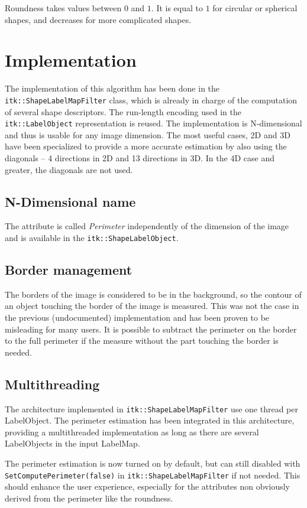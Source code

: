 \documentclass{InsightArticle}
\begin{document}
Roundness takes values between $0$ and $1$. 
It is equal to $1$ for circular or spherical shapes, 
and decreases for more complicated shapes.


\section{Implementation}

The implementation of this algorithm has been done in the \verb$itk::ShapeLabelMapFilter$ class, which is already in charge of the computation of
several shape descriptors. The run-length encoding used in the \verb$itk::LabelObject$ representation is reused.
The implementation is N-dimensional and thus is usable for any image dimension. The most useful cases, 2D and 3D have been specialized
to provide a more accurate estimation by also using the diagonals -- 4 directions in 2D and 13 directions in 3D. In the 4D case and greater,
the diagonals are not used.

\subsection{N-Dimensional name}
The attribute is called {\em Perimeter} independently of the dimension of the image and is available in the \verb$itk::ShapeLabelObject$.

\subsection{Border management}

The borders of the image is considered to be in the background, so the contour of an object touching the border of the image is measured.
This was not the case in the previous (undocumented) implementation and has been proven to be misleading for many users.
It is possible to subtract the perimeter on the border to the full perimeter if the measure without the part touching the border is needed.

\subsection{Multithreading}

The architecture implemented in \verb$itk::ShapeLabelMapFilter$ use one thread per LabelObject. The perimeter estimation has been integrated in this
architecture, providing a multithreaded implementation as long as there are several LabelObjects in the input LabelMap.


The perimeter estimation is now turned on by default, but can still disabled with \verb$SetComputePerimeter(false)$ in
\verb$itk::ShapeLabelMapFilter$ if not needed. This should enhance the user experience, especially for the attributes non obviously derived
from the perimeter like the roundness.
\end{document}
